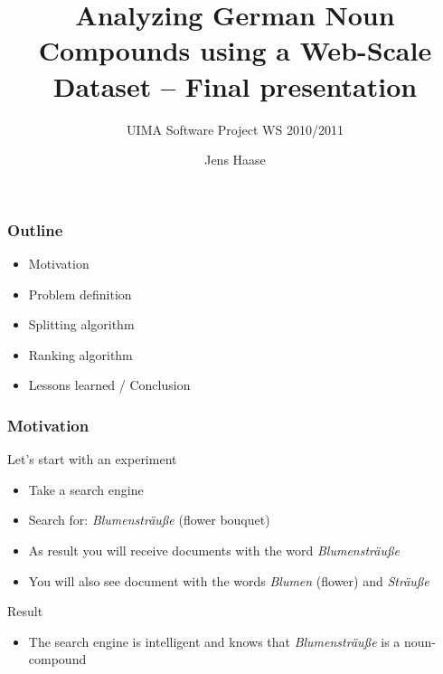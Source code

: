 \documentclass[accentcolor=tud9b, colorbacktitle, inverttitle]{tudbeamer}
\begin{document}
\author{Jens Haase} \title{Analyzing German Noun Compounds using a
  Web-Scale Dataset -- Final presentation} \subtitle{UIMA Software
  Project WS 2010/2011}

\begin{titleframe}
\end{titleframe}

\begin{frame}
  \frametitle{Outline}
  \begin{itemize}
    \item Motivation
    \item Problem definition
    \item Splitting algorithm
    \item Ranking algorithm
    \item Lessons learned / Conclusion
  \end{itemize}
\end{frame}

\begin{frame}
  \frametitle{Motivation}
  \begin{block}{Let's start with an experiment}
  \begin{itemize}
    \item Take a search engine
    \item Search for: \emph{Blumensträuße} (flower bouquet)
    \item As result you will receive documents with the word \emph{Blumensträuße}
    \item You will also see document with the words \emph{Blumen} (flower) and \emph{Sträuße}
  \end{itemize}
  \end{block}

  \begin{block}{Result}
  \begin{itemize}
    \item The search engine is intelligent and knows that \emph{Blumensträuße} is a noun-compound
  \end{itemize}
  \end{block}
\end{frame}
\end{document}
